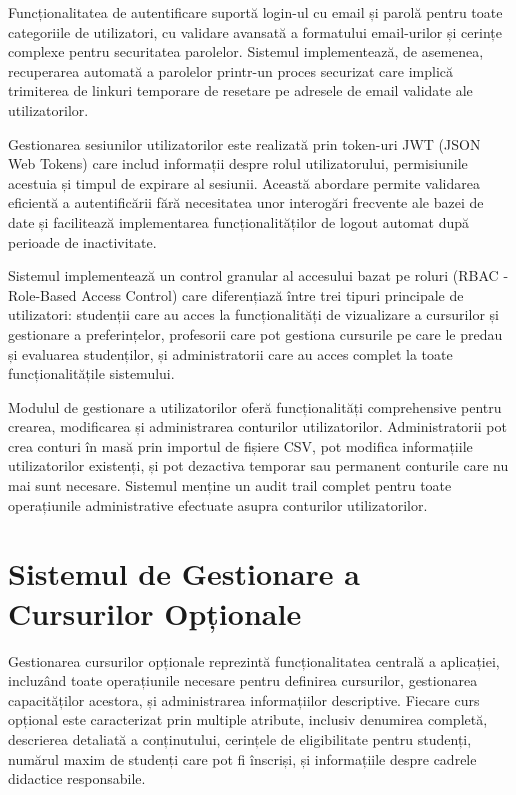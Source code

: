 \documentclass[12pt,a4paper]{report}
\begin{document}
Funcționalitatea de autentificare suportă login-ul cu email și parolă pentru toate categoriile de utilizatori, cu validare avansată a formatului email-urilor și cerințe complexe pentru securitatea parolelor. Sistemul implementează, de asemenea, recuperarea automată a parolelor printr-un proces securizat care implică trimiterea de linkuri temporare de resetare pe adresele de email validate ale utilizatorilor.

Gestionarea sesiunilor utilizatorilor este realizată prin token-uri JWT (JSON Web Tokens) care includ informații despre rolul utilizatorului, permisiunile acestuia și timpul de expirare al sesiunii. Această abordare permite validarea eficientă a autentificării fără necesitatea unor interogări frecvente ale bazei de date și facilitează implementarea funcționalităților de logout automat după perioade de inactivitate.

Sistemul implementează un control granular al accesului bazat pe roluri (RBAC - Role-Based Access Control) care diferențiază între trei tipuri principale de utilizatori: studenții care au acces la funcționalități de vizualizare a cursurilor și gestionare a preferințelor, profesorii care pot gestiona cursurile pe care le predau și evaluarea studenților, și administratorii care au acces complet la toate funcționalitățile sistemului.

Modulul de gestionare a utilizatorilor oferă funcționalități comprehensive pentru crearea, modificarea și administrarea conturilor utilizatorilor. Administratorii pot crea conturi în masă prin importul de fișiere CSV, pot modifica informațiile utilizatorilor existenți, și pot dezactiva temporar sau permanent conturile care nu mai sunt necesare. Sistemul menține un audit trail complet pentru toate operațiunile administrative efectuate asupra conturilor utilizatorilor.

\section{Sistemul de Gestionare a Cursurilor Opționale}

Gestionarea cursurilor opționale reprezintă funcționalitatea centrală a aplicației, incluzând toate operațiunile necesare pentru definirea cursurilor, gestionarea capacităților acestora, și administrarea informațiilor descriptive. Fiecare curs opțional este caracterizat prin multiple atribute, inclusiv denumirea completă, descrierea detaliată a conținutului, cerințele de eligibilitate pentru studenți, numărul maxim de studenți care pot fi înscriși, și informațiile despre cadrele didactice responsabile.
\end{document}
